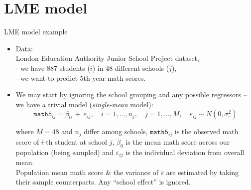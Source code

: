 \documentclass{beamer}
\begin{document}
\section{LME model}
\begin{frame}{LME model example}
\begin{itemize}
\item Data: \\London Education Authority Junior School Project
dataset, \\- we have 887 students ($i$) in 48 different schools ($j$),\\- we want to predict 5th-year math scores.
\medskip
\item We may start by ignoring the school grouping and any possible regressors -- we have a trivial model (\textit{single-mean} model):
$$ \texttt{math5}_{ij} = \beta_0~+~\varepsilon_{ij}, \quad i=1,\dots,n_j,  \quad j=1,\dots, M,  \quad \varepsilon_{ij} \sim N(0,\sigma^2_{\varepsilon}) $$

where $M=48$ and $n_j$ differ among schools, $\texttt{math5}_{ij}$ is the observed  math score of $i$-th student at school $j$,
$\beta_0$ is the mean math score across our population (being sampled) and
$\varepsilon_{ij}$ is the individual deviation from overall mean.\\
\medskip
Population mean math score \& the variance of $\varepsilon$ are estimated by taking their sample counterparts. Any ``school effect'' is ignored.\\
\end{itemize}
\end{frame}
\end{document}
